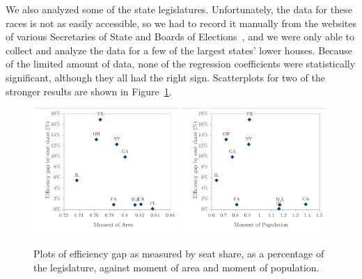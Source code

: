 \documentclass[12pt]{article}
\begin{document}
  We also analyzed some of the state legislatures.  Unfortunately, the data for these races is not as easily accessible, so we had to record it manually from the websites of various Secretaries of State and Boards of Elections~\cite{heda,florida,georgia,illinois,newyork,washington}, and we were only able to collect and analyze the data for a few of the largest states' lower houses.  Because of the limited amount of data, none of the regression coefficients were statistically significant, although they all had the right sign.  Scatterplots for two of the stronger results are shown in Figure~\ref{f:stateplots}.

  \begin{figure}
    \begin{center}
      \includegraphics[width=0.49\textwidth]{sldl-ssp-moment_area.pdf}
      \includegraphics[width=0.49\textwidth]{sldl-ssp-moment_pop.pdf}

      \caption{Plots of efficiency gap as measured by seat share, as a percentage of the legislature, against moment of area and moment of population.\label{f:stateplots}}
    \end{center}
  \end{figure}
\end{document}
